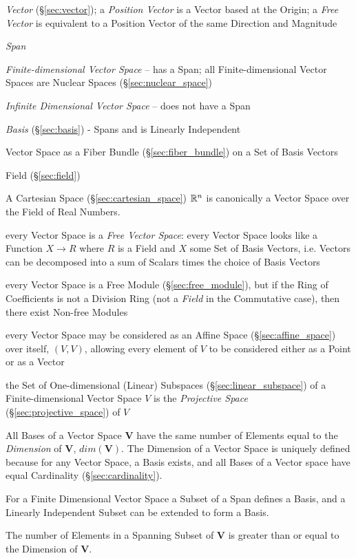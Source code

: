\emph{Vector} (\S\ref{sec:vector}); a \emph{Position Vector} is a Vector based
at the Origin; a \emph{Free Vector} is equivalent to a Position Vector of the
same Direction and Magnitude

\emph{Span}

\emph{Finite-dimensional Vector Space} -- has a Span; all
Finite-dimensional Vector Spaces are Nuclear Spaces
(\S\ref{sec:nuclear_space})

\emph{Infinite Dimensional Vector Space} -- does not have a Span

\emph{Basis} (\S\ref{sec:basis}) - Spans and is Linearly Independent

Vector Space as a Fiber Bundle (\S\ref{sec:fiber_bundle}) on a Set of Basis
Vectors

Field (\S\ref{sec:field})

A Cartesian Space (\S\ref{sec:cartesian_space}) $\mathbb{R}^n$ is canonically a
Vector Space over the Field of Real Numbers.

every Vector Space is a \emph{Free Vector Space}: every Vector Space
looks like a Function $X \rightarrow R$ where $R$ is a Field and $X$
some Set of Basis Vectors, i.e. Vectors can be decomposed into a sum
of Scalars times the choice of Basis Vectors %

every Vector Space is a Free Module (\S\ref{sec:free_module}), but if the Ring
of Coefficients is not a Division Ring (not a \emph{Field} in the Commutative
case), then there exist Non-free Modules

every Vector Space may be considered as an Affine Space
(\S\ref{sec:affine_space}) over itself, $(V,V)$, allowing every element of $V$
to be considered either as a Point or as a Vector

the Set of One-dimensional (Linear) Subspaces (\S\ref{sec:linear_subspace}) of a
Finite-dimensional Vector Space $V$ is the \emph{Projective Space}
(\S\ref{sec:projective_space}) of $V$

All Bases of a Vector Space $\mathbf{V}$ have the same number of
Elements equal to the \emph{Dimension} of $\mathbf{V}$,
$dim(\mathbf{V})$. The Dimension of a Vector Space is uniquely defined
because for any Vector Space, a Basis exists, and all Bases of a
Vector space have equal Cardinality (\S\ref{sec:cardinality}).

For a Finite Dimensional Vector Space a Subset of a Span defines a
Basis, and a Linearly Independent Subset can be extended to form a
Basis.

The number of Elements in a Spanning Subset of $\mathbf{V}$ is greater
than or equal to the Dimension of $\mathbf{V}$.

